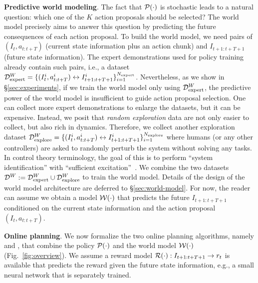 \textbf{Predictive world modeling}. The fact that ${\cal P}(\cdot)$ is stochastic leads to a natural question: which one of the $K$ action proposals should be selected? The world model precisely aims to answer this question by predicting the future consequences of each action proposal. To build the world model, we need pairs of $(I_t,a_{t:t+T})$ (current state information plus an action chunk) and $I_{t+1:t+T+1}$ (future state information). The expert demonstrations used for policy training already contain such pairs, i.e., a dataset ${\cal D}_{\text{expert}}^W = \{(I^i_t, a^i_{t:t+T}) \leftrightarrow I_{t+1:t+T+1}^i \}_{i=1}^{N_{\text{expert}}}$. Nevertheless, as we show in \S\ref{sec:experiments}, if we train the world model only using ${\cal D}_{\text{expert}}^W$, the predictive power of the world model is insufficient to guide action proposal selection. One can collect more expert demonstrations to enlarge the datasets, but it can be expensive. Instead, we posit that \emph{random exploration} data are not only easier to collect, but also rich in dynamics. Therefore, we collect another exploration dataset ${\cal D}^W_{\text{explore}} =\{(I^i_t, a^i_{t:t+T}) \leftrightarrow I_{t+1:t+T+1}^i \}_{i=1}^{N_{\text{explore}}}$ where humans (or any other controllers) are asked to randomly perturb the system without solving any tasks. In control theory terminology, the goal of this is to perform ``system identification'' with ``sufficient excitation''~\cite{lennart1999system}. We combine the two datasets ${\cal D}^W := {\cal D}^W_{\text{expert}} \cup {\cal D}^W_{\text{explore}}$ to train the world model. Details of the design of the world model architecture are deferred to \S\ref{sec:world-model}. For now, the reader can assume we obtain a model ${\cal W}(\cdot)$ that predicts the future $I_{t+1:t+T+1}$ conditioned on the current state information and the action proposal $(I_t, a_{t:t+T})$.

\textbf{Online planning}. We now formalize the two online planning algorithms, namely \gpcrank and \gpcopt, that combine the policy ${\cal P}(\cdot)$ and the world model ${\cal W}(\cdot)$ (\cf Fig.~\ref{fig:overview}). We assume a reward model ${\cal R}(\cdot): I_{t+1:t+T+1} \rightarrow r_{t}$ is available that predicts the reward given the future state information, e.g., a small neural network that is separately trained.

